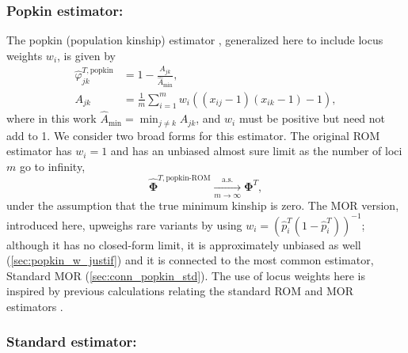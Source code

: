 \documentclass[9pt,twocolumn,twoside]{gsajnl}
\newcommand{\xij}[1][j]{x_{i#1}}
\newcommand{\pith}{\hat{p}_i^T}
\newcommand{\ktHatNamed}[2][k]{\hat{\varphi}_{j#1}^{T,\text{#2}}}
\newcommand{\kinMat}[1][T]{\mathbf{\Phi}^{#1}}
\newcommand{\kinMatEstNamed}[1]{\mathbf{\hat{\Phi}}^{T,\text{#1}}}
\newcommand{\Ajk}[1][k]{A_{j#1}}
\newcommand{\AMinHat}{\hat{A}_{\text{min}}}
\newcommand{\toas}{\xrightarrow[m \rightarrow \infty]{\text{a.s.}}}
\begin{document}
\subsubsection{Popkin estimator:}

The popkin (population kinship) estimator \citep{ochoa_estimating_2021}, generalized here to include locus weights $w_i$, is given by
\begin{equation}
  \label{eq:popkin}
  \begin{split}
    \ktHatNamed{popkin}
    &=
      1 - \frac{\Ajk}{\AMinHat}
      ,\\
    \Ajk
    &=
      \frac{1}{m} \sum_{i=1}^m w_i ( (\xij-1)(\xij[k]-1) - 1 )
      ,
  \end{split}
\end{equation}
where in this work $\AMinHat = \min_{j \ne k} \Ajk$, and $w_i$ must be positive but need not add to 1.
We consider two broad forms for this estimator.
The original ROM estimator has $w_i = 1$ and has an unbiased almost sure limit as the number of loci $m$ go to infinity,
$$
\kinMatEstNamed{popkin-ROM} \toas \kinMat,
$$
under the assumption that the true minimum kinship is zero.
The MOR version, introduced here, upweighs rare variants by using $w_i = \left( \pith \left( 1 - \pith \right) \right)^{-1}$; although it has no closed-form limit, it is approximately unbiased as well (\cref{sec:popkin_w_justif}) and it is connected to the most common estimator, Standard MOR (\cref{sec:conn_popkin_std}). 
The use of locus weights here is inspired by previous calculations relating the standard ROM and MOR estimators \citep{wang_efficient_2017}.

\subsubsection{Standard estimator:}
\end{document}
